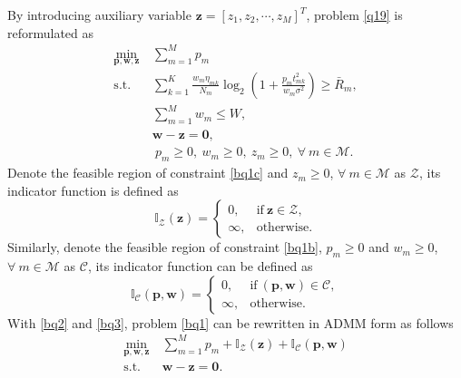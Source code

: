 \documentclass[journal]{IEEEtran}
\begin{document}
By introducing auxiliary variable $\mathbf{z} = \left[z_1, z_2, \cdots, z_M\right]^T$, problem \eqref{q19} is reformulated as
\begin{subequations}\label{bq1}
\begin{align}
\label{bq1a}\min_{\mathbf{p}, \mathbf{w}, \mathbf{z}}\ & \sum\limits_{m=1}^{M} p_m \\
\label{bq1b} \mbox{s.t.}\ \ &\sum\limits_{k= 1}^{K}\frac{w_m \eta_{mk}}{N_m}\log_2\left(1 + \frac{p_mt_{mk}^2}{w_m\sigma^2}\right)\geq \bar{R}_m,\\
\label{bq1c} &\sum_{m=1}^{M} w_m \leq W,\\
\label{bq1d} &\mathbf{w} - \mathbf{z} = \mathbf{0},\\
\label{bq1e} &\ p_m \geq 0,\ w_m \geq 0,\ z_m \geq 0,\ \forall\ m\in\mathcal{M}.
\end{align}
\end{subequations}
Denote the feasible region of constraint \eqref{bq1c} and $z_m\geq 0$, $\forall\ m\in\mathcal{M}$ as $\mathcal{Z}$, its indicator function is defined as
\begin{equation}\label{bq2}
\mathbb{I}_\mathcal{Z}\left(\mathbf{z}\right) = \left\{ \begin{array}{lcl}
0, &\mbox{if} \ \mathbf{z} \in \mathcal{Z}, \\
\infty, &\mbox{otherwise}.
\end{array}
\right.
\end{equation}
Similarly, denote the feasible region of constraint \eqref{bq1b}, $p_m\geq 0$ and $w_m\geq 0$, $\forall\ m\in\mathcal{M}$ as $\mathcal{C}$, its indicator function can be defined as
\begin{equation}\label{bq3}
\mathbb{I}_\mathcal{C}\left(\mathbf{p},\mathbf{w}\right) = \left\{ \begin{array}{lcl}
0, &\mbox{if} \ \left(\mathbf{p}, \mathbf{w}\right) \in \mathcal{C}, \\
\infty, &\mbox{otherwise}.
\end{array}
\right.
\end{equation}
With \eqref{bq2} and \eqref{bq3}, problem \eqref{bq1} can be rewritten in ADMM form as follows
\begin{subequations}\label{bq4}
\begin{align}\label{bq4a}
\min_{\mathbf{p}, \mathbf{w}, \mathbf{z}}\ & \sum\limits_{m=1}^{M} p_m + \mathbb{I}_\mathcal{Z}\left(\mathbf{z}\right) + \mathbb{I}_\mathcal{C}\left(\mathbf{p},\mathbf{w}\right)\\
\label{bq4b}\mbox{s.t.}\ \ &  \mathbf{w} - \mathbf{z} = \mathbf{0}.
\end{align}
\end{subequations}
\end{document}
